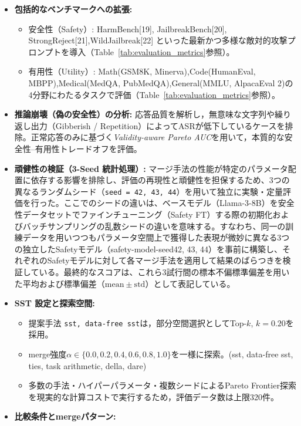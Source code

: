 \documentclass{article}
\begin{document}
\begin{itemize}
    \item \textbf{包括的なベンチマークへの拡張:}
    \begin{itemize}
        \item 安全性（Safety）:
        HarmBench[19], JailbreakBench[20], StrongReject[21],WildJailbreak[22] といった最新かつ多様な敵対的攻撃プロンプトを導入（Table~\ref{tab:evaluation_metrics}参照）。
        \item 有用性（Utility）:
        Math(GSM8K, Minerva),Code(HumanEval, MBPP),Medical(MedQA, PubMedQA),General(MMLU, AlpacaEval 2)の4分野にわたるタスクで評価（Table~\ref{tab:evaluation_metrics}参照）。
    \end{itemize}
    \item \textbf{推論崩壊（偽の安全性）の分析:}
    応答品質を解析し，無意味な文字列や繰り返し出力（Gibberish / Repetition）によってASRが低下しているケースを排除。正常応答のみに基づく\textit{Validity-aware Pareto AUC}を用いて，本質的な安全性--有用性トレードオフを評価。
    \item \textbf{頑健性の検証（3-Seed 統計処理）:}
    マージ手法の性能が特定のパラメータ配置に依存する影響を排除し、評価の再現性と頑健性を担保するため、3つの異なるランダムシード（\texttt{seed = 42, 43, 44}）を用いて独立に実験・定量評価を行った。ここでのシードの違いは、ベースモデル（Llama-3-8B）を安全性データセットでファインチューニング（Safety FT）する際の初期化およびバッチサンプリングの乱数シードの違いを意味する。すなわち、同一の訓練データを用いつつもパラメータ空間上で獲得した表現が微妙に異なる3つの独立したSafetyモデル（safety-model-seed42, 43, 44）を事前に構築し、それぞれのSafetyモデルに対して各マージ手法を適用して結果のばらつきを検証している。最終的なスコアは、これら3試行間の標本不偏標準偏差を用いた平均および標準偏差（$\mathrm{mean} \pm \mathrm{std}$）として表記している。
    \item \textbf{SST 設定と探索空間:}
    \begin{itemize}
        \item 提案手法 \texttt{sst, data-free sst}は，部分空間選択としてTop-$k$, $k=0.20$を採用。
        \item merge強度$\alpha \in \{0.0, 0.2, 0.4, 0.6, 0.8, 1.0\}$を一様に探索。(sst, data-free sst, ties, task arithmetic, della, dare)
        \item 多数の手法・ハイパーパラメータ・複数シードによるPareto Frontier探索を現実的な計算コストで実行するため，評価データ数は上限320件。
    \end{itemize}
    \item \textbf{比較条件とmergeパターン:}

\end{itemize}
\end{document}
